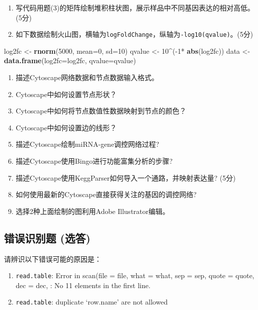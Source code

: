 \documentclass[]{article}
\newenvironment{Shaded}{\begin{snugshade}}{\end{snugshade}}
\newcommand{\KeywordTok}[1]{\textcolor[rgb]{0.13,0.29,0.53}{\textbf{{#1}}}}
\newcommand{\DataTypeTok}[1]{\textcolor[rgb]{0.13,0.29,0.53}{{#1}}}
\newcommand{\DecValTok}[1]{\textcolor[rgb]{0.00,0.00,0.81}{{#1}}}
\newcommand{\StringTok}[1]{\textcolor[rgb]{0.31,0.60,0.02}{{#1}}}
\newcommand{\NormalTok}[1]{{#1}}
\numberwithin{figure}{section}
\numberwithin{table}{section}
\theoremstyle{definition}
\theoremstyle{definition}
\theoremstyle{definition}
\theoremstyle{remark}
\begin{document}
\begin{enumerate}
\def\labelenumi{\arabic{enumi}.}
\setcounter{enumi}{9}
\item
  写代码用题(3)的矩阵绘制堆积柱状图，展示样品中不同基因表达的相对高低。(5分)
\item
  如下数据绘制火山图，横轴为\texttt{logFoldChange}，纵轴为\texttt{-log10(qvalue)}。(5分)
\end{enumerate}

\begin{Shaded}
\begin{Highlighting}[]
\NormalTok{log2fc <-}\StringTok{ }\KeywordTok{rnorm}\NormalTok{(}\DecValTok{5000}\NormalTok{, }\DataTypeTok{mean=}\DecValTok{0}\NormalTok{, }\DataTypeTok{sd=}\DecValTok{10}\NormalTok{)}
\NormalTok{qvalue <-}\StringTok{ }\DecValTok{10}\NormalTok{^(-}\DecValTok{1}\NormalTok{*}\StringTok{ }\KeywordTok{abs}\NormalTok{(log2fc))}
\NormalTok{data <-}\StringTok{ }\KeywordTok{data.frame}\NormalTok{(}\DataTypeTok{log2fc=}\NormalTok{log2fc, }\DataTypeTok{qvalue=}\NormalTok{qvalue)}
\end{Highlighting}
\end{Shaded}

\begin{enumerate}
\def\labelenumi{\arabic{enumi}.}
\setcounter{enumi}{11}
\item
  描述Cytoscape网络数据和节点数据输入格式。
\item
  Cytoscape中如何设置节点形状？
\item
  Cytoscape中如何将节点数值性数据映射到节点的颜色？
\item
  Cytoscape中如何设置边的线形？
\item
  描述Cytoscape绘制miRNA-gene调控网络过程?
\item
  描述Cytoscape使用Bingo进行功能富集分析的步骤?
\item
  描述Cytoscape使用KeggParser如何导入一个通路，并映射表达量? (5分)
\item
  如何使用最新的Cytoscape直接获得关注的基因的调控网络?
\item
  选择2种上面绘制的图利用Adobe Illustrator编辑。
\end{enumerate}

\subsection{错误识别题 (选答)}\label{-}

请辨识以下错误可能的原因是：

\begin{enumerate}
\def\labelenumi{\arabic{enumi}.}
\item
  \texttt{read.table}: Error in scan(file = file, what = what, sep =
  sep, quote = quote, dec = dec, : No 11 elements in the first line.
\item
  \texttt{read.table}: duplicate `row.name' are not allowed
\end{enumerate}
\end{document}
